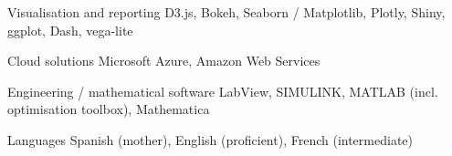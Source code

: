 \begin{cvskills}

\cvskill
{Visualisation and reporting } %
{D3.js, Bokeh, Seaborn / Matplotlib, Plotly, Shiny, ggplot, Dash, vega-lite} %


\cvskill
{Cloud solutions } %
{Microsoft Azure, Amazon Web Services } %





\cvskill
{Engineering / mathematical software } %
{LabView, SIMULINK, MATLAB (incl. optimisation toolbox), Mathematica } %


\cvskill
{Languages} %
{Spanish (mother), English (proficient), French (intermediate)} %


\end{cvskills}